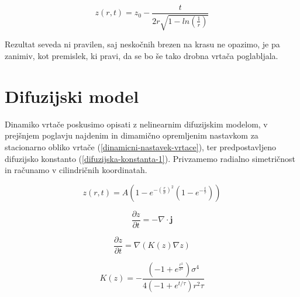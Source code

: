 \documentclass[a4paper, oneside, 12pt]{book}
\begin{document}
  \begin{equation}
    z(r,t) = z_0 - \frac{t}{2 r \sqrt{1-ln\left(\frac{1}{r}\right)}}
    \label{darcy-z}
  \end{equation}

  Rezultat seveda ni pravilen, saj neskočnih brezen na krasu ne opazimo, je pa zanimiv, kot premislek, ki pravi, da se bo še tako drobna vrtača poglabljala.


  \section{Difuzijski model}

  Dinamiko vrtače poskusimo opisati z nelinearnim difuzijskim modelom, v prejšnjem poglavju najdenim in dimamično opremljenim nastavkom za stacionarno obliko vrtače (\ref{dinamicni-nastavek-vrtace}), ter  predpostavljeno difuzijsko konstanto (\ref{difuzijska-konstanta-1}). Privzamemo radialno simetričnost in računamo v cilindričnih koordinatah.

  \begin{equation}
    z(r,t) = A\left(1-e^{-\left(\frac{r}{\sigma }\right)^2}\left(1-e^{-\frac{t}{\tau }}\right)\right)
    \label{dinamicni-nastavek-vrtace}
  \end{equation}

  \begin{equation}
    \frac{\partial z}{\partial t} = - \nabla \cdot \mathbf{j}
    \label{kontinuitetna-enacba}
  \end{equation}

  \begin{equation}
    \frac{\partial z}{\partial t} = \nabla (K(z) \nabla z)
    \label{nelinearna-difuzijska-enacba}
  \end{equation}

  \begin{equation}
    K(z) = -\frac{\left(-1+e^{\frac{r^2}{\sigma ^2}}\right) \sigma ^4}{4 \left(-1+e^{t/\tau }\right) r^2 \tau }
    \label{difuzijska-konstanta-1}
  \end{equation}

\end{document}
